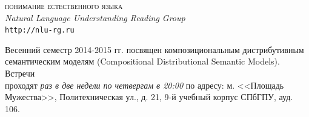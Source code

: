\documentclass[12pt]{article}
\begin{document}
\baselineskip 15pt

\parindent 0cm


\begin{center}
{\rm \Huge \textsc{понимание естественного языка}}\\
\medskip
{\rm \Large \textit{Natural Language Understanding Reading Group}}\\
\medskip
{\rm \Large \texttt{http://nlu-rg.ru}}
\end{center}

\bigskip

\baselineskip 12pt

\begin{spacing}{1.15}
Весенний семестр 2014-2015 гг. посвящен композициональным дистрибутивным \\семантическим моделям (Compositional Distributional Semantic Models). Встречи \\проходят \textit{раз в две недели по четвергам в 20:00} по адресу: м. <<Площадь Мужества>>, Политехническая ул., д. 21, 9-й учебный корпус СПбГПУ, ауд. 106.
\end{spacing}

\end{document}
